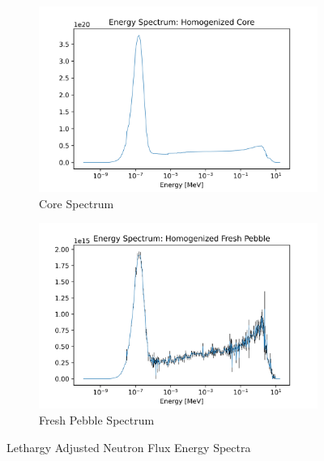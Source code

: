 \begin{figure}[H]
\centering
%
\begin{subfigure}{0.95\textwidth}
  \includegraphics[width=0.95\linewidth]{figures/core_spec_homog}
  \caption{Core Spectrum}
  \label{fig:hom-core}
\end{subfigure}%

\begin{subfigure}{0.95\textwidth}
  \includegraphics[width=0.95\linewidth]{figures/fresh_spec_homog}
  \caption{Fresh Pebble Spectrum}
  \label{fig:hom-fresh}
\end{subfigure}%

\caption{Lethargy Adjusted Neutron Flux Energy Spectra}
\end{figure}

